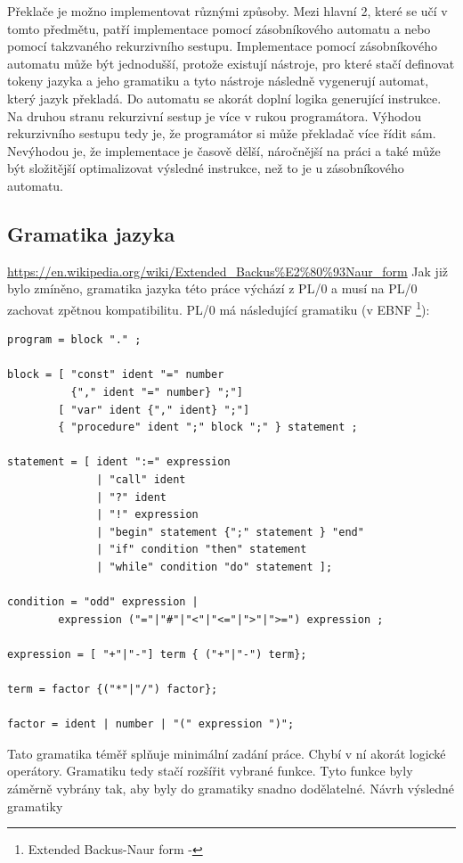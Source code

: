\documentclass[12pt, letterpaper]{article}
\begin{document}
Překlače je možno implementovat různými způsoby. Mezi hlavní 2, které se učí v tomto předmětu, patří implementace pomocí
zásobníkového automatu a nebo pomocí takzvaného rekurzivního sestupu. Implementace pomocí zásobníkového automatu může
být jednodušší, protože existují nástroje, pro které stačí definovat tokeny jazyka a jeho gramatiku a tyto nástroje
následně vygenerují automat, který jazyk překladá. Do automatu se akorát doplní logika generující instrukce. Na druhou
stranu rekurzivní sestup je více v rukou programátora. Výhodou rekurzivního sestupu tedy je, že programátor si může
překladač více řídit sám. Nevýhodou je, že implementace je časově dělší, náročnější na práci a také může být složitější
optimalizovat výsledné instrukce, než to je u zásobníkového automatu.
%
\subsection{Gramatika jazyka}
\urldef{\urlA}\url{https://en.wikipedia.org/wiki/Extended_Backus%E2%80%93Naur_form}
Jak již bylo zmíněno, gramatika jazyka této práce výchází z PL/0 a musí na PL/0 zachovat zpětnou kompatibilitu.
PL/0 má následující gramatiku (v EBNF
\footnote{Extended Backus-Naur form - \urlA}):
%
\begin{lstlisting}[caption=Originální PL/0 gramatika, captionpos=b]
program = block "." ;

block = [ "const" ident "=" number 
          {"," ident "=" number} ";"]
        [ "var" ident {"," ident} ";"]
        { "procedure" ident ";" block ";" } statement ;

statement = [ ident ":=" expression 
              | "call" ident 
              | "?" ident 
              | "!" expression 
              | "begin" statement {";" statement } "end" 
              | "if" condition "then" statement 
              | "while" condition "do" statement ];

condition = "odd" expression |
        expression ("="|"#"|"<"|"<="|">"|">=") expression ;

expression = [ "+"|"-"] term { ("+"|"-") term};

term = factor {("*"|"/") factor};

factor = ident | number | "(" expression ")";
\end{lstlisting}
%
Tato gramatika téměř splňuje minimální zadání práce. Chybí v ní akorát logické operátory. Gramatiku tedy stačí rozšířit
vybrané funkce. Tyto funkce byly záměrně vybrány tak, aby byly do gramatiky snadno dodělatelné. Návrh výsledné gramatiky
\end{document}
